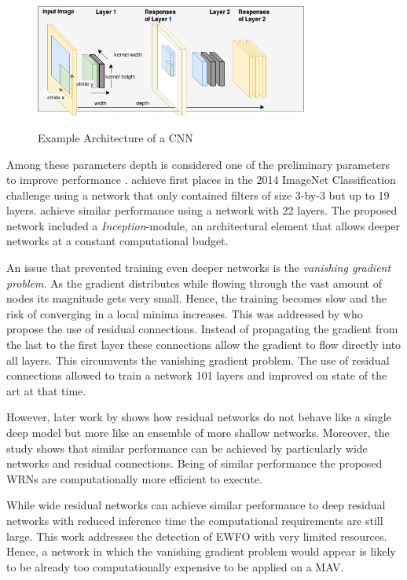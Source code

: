 	\begin{figure}[hbtp]
		\centering
		\includegraphics[width=0.8\textwidth]{fig/model_design}
		\label{fig:model_design}
		\caption{Example Architecture of a \ac{CNN}}
	\end{figure}
	
	Among these parameters depth is considered one of the preliminary parameters to improve performance \cite{He}. \citeauthor{Simonyan2014} \cite{Simonyan2014} achieve first places in the 2014 ImageNet Classification challenge using a network that only contained filters of size 3-by-3 but up to 19 layers. \citeauthor{Szegedy2014} \cite{Szegedy2014} achieve similar performance using a network with 22 layers. The proposed network included a \textit{Inception}-module, an architectural element that allows deeper networks at a constant computational budget. 
	
	An issue that prevented training even deeper networks is the \textit{vanishing gradient problem}. As the gradient distributes while flowing through the vast amount of nodes its magnitude gets very small. Hence, the training becomes slow and the risk of converging in a local minima increases. This was addressed by \citeauthor{He2015} \cite{He2015} who propose the use of residual connections. Instead of propagating the gradient from the last to the first layer these connections allow the gradient to flow directly into all layers. This circumvents the vanishing gradient problem. The use of residual connections allowed to train a network 101 layers and improved on state of the art at that time.
	
	However, later work by \citeauthor{Zagoruyko2016} \cite{Zagoruyko2016} shows how residual networks do not behave like a single deep model but more like an ensemble of more shallow networks. Moreover, the study shows that similar performance can be achieved by particularly wide networks and residual connections. Being of similar performance the proposed \acp{WRN} are computationally more efficient to execute.
	
	While wide residual networks can achieve similar performance to deep residual networks with reduced inference time the computational requirements are still large. This work addresses the detection of \ac{EWFO} with very limited resources. Hence, a network in which the vanishing gradient problem would appear is likely to be already too computationally expensive to be applied on a \ac{MAV}.
	
